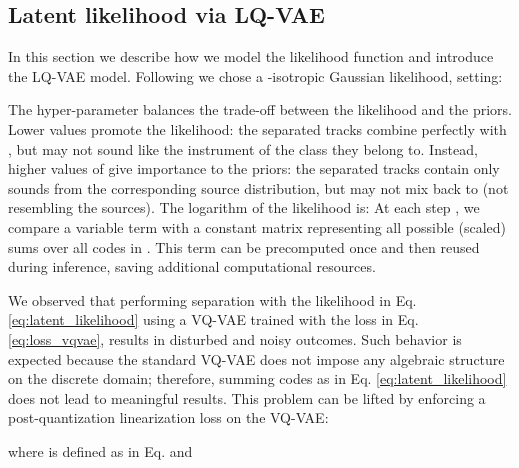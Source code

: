\documentclass[a4paper]{article}
\begin{document}
         
\subsection{Latent likelihood via LQ-VAE} \label{sec:likelihood}
 In this section we describe how we model the likelihood function and introduce the LQ-VAE model. Following \cite{jayaram2020} we chose a -isotropic Gaussian likelihood, setting:

The hyper-parameter  balances the trade-off between the likelihood and the priors. Lower values promote the likelihood: the separated tracks combine perfectly with , but may not sound like the instrument of the class they belong to. Instead, higher values of  give importance to the priors: the separated tracks contain only sounds from the corresponding source distribution, but may not mix back to  (not resembling the sources).
The logarithm of the likelihood is: 
At each step , we compare a variable term  with a constant matrix  representing all possible (scaled) sums over all codes in . This term can be precomputed once and then reused during inference, saving additional computational resources.

We observed that performing separation with the likelihood in Eq. \eqref{eq:latent_likelihood} using a VQ-VAE trained with the loss in
Eq. \eqref{eq:loss_vqvae}, results in disturbed and noisy outcomes. Such behavior is expected because the standard VQ-VAE does not impose any algebraic structure on the discrete domain; therefore, summing codes as in Eq. \eqref{eq:latent_likelihood} does not lead to meaningful results. This problem can be lifted by enforcing a post-quantization linearization loss on the VQ-VAE: 

where  is defined as in Eq.   and
\end{document}
